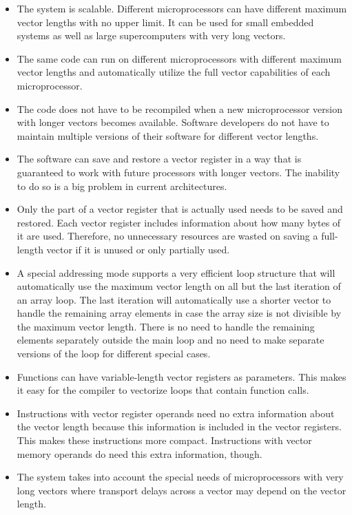 \documentclass[forwardcom.tex]{subfiles}
\begin{document}
\begin{itemize}
\item The system is scalable. Different microprocessors can have different maximum vector lengths with no upper limit. It can be used for small embedded systems as well as large supercomputers with very long vectors. 

\item The same code can run on different microprocessors with different maximum vector lengths and automatically utilize the full vector capabilities of each microprocessor. 

\item The code does not have to be recompiled when a new microprocessor version with longer vectors becomes available. Software developers do not have to maintain multiple versions of their software for different vector lengths. 

\item The software can save and restore a vector register in a way that is guaranteed to work with future processors with longer vectors. The inability to do so is a big problem in current architectures. 

\item Only the part of a vector register that is actually used needs to be saved and restored. Each vector register includes information about how many bytes of it are used. Therefore, no unnecessary resources are wasted on saving a full-length vector if it is unused or only partially used. 

\item A special addressing mode supports a very efficient loop structure that will automatically use the maximum vector length on all but the last iteration of an array loop. The last iteration will automatically use a shorter vector to handle the remaining array elements in case the array size is not divisible by the maximum vector length. There is no need to handle the remaining elements separately outside the main loop and no need to make separate versions of the loop for different special cases. 

\item Functions can have variable-length vector registers as parameters. This makes it easy for the compiler to vectorize loops that contain function calls. 

\item Instructions with vector register operands need no extra information about the vector length because this information is included in the vector registers. This makes these instructions more compact. Instructions with vector memory operands do need this extra information, though.

\item The system takes into account the special needs of microprocessors with very long vectors where transport delays across a vector may depend on the vector length.
\end{itemize}
\end{document}
